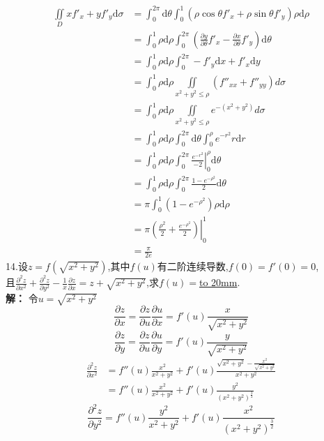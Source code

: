 \documentclass[a4paper]{article}
\begin{document}
\begin{align*}
    \iint\limits_{D} xf'_{x}+yf'_{y}\mathrm{d}\sigma &=\int_{0}^{2\pi} \mathrm{d}\theta \int_{0}^{1}(\rho\cos \theta f'_{x}+\rho\sin \theta f'_{y})\rho \mathrm{d}\rho\\
    &=\int_{0}^{1} \rho\mathrm{d}\rho \int_{0}^{2\pi} (\frac{\partial y}{\partial \theta}f'_{x}-\frac{\partial x}{\partial \theta}f'_{y})\mathrm{d}\theta\\
    &=\int_{0}^{1}\rho\mathrm{d}\rho\int_{0}^{2\pi}-f'_{y}\mathrm{d}x+f'_{x}\mathrm{d}y\\
    &=\int_{0}^{1}\rho\mathrm{d}\rho \iint\limits_{x^2+y^2\le \rho} (f''_{xx}+f''_{yy})d\sigma\\
    &=\int_{0}^{1}\rho\mathrm{d}\rho \iint\limits_{x^2+y^2\le \rho} e^{-(x^2+y^2)}d\sigma\\
    &=\int_{0}^{1}\rho \mathrm{d}\rho \int_{0}^{2\pi}\mathrm{d} \theta \int_{0}^{\rho} e^{-r^2} r\mathrm{d}r\\
    &=\int_{0}^{1}\rho \mathrm{d}\rho \int_{0}^{2\pi} \left. \frac{e^{-r^2}}{-2} \right|_{0}^{\rho} \mathrm{d} \theta\\
    &=\int_{0}^{1} \rho \mathrm{d}\rho \int_{0}^{2\pi}\frac{1-e^{-\rho^2}}{2}\mathrm{d}\theta \\
    &=\pi\int_{0}^{1} (1-e^{-\rho^2})\rho \mathrm{d}\rho\\
    &=\left.\pi(\frac{\rho^2}{2}+\frac{e^{-\rho^2}}{2})\right|_{0}^{1}\\
    &=\frac{\pi}{2e}
\end{align*}
14.设$z=f(\sqrt{x^2+y^2})$,其中$f(u)$有二阶连续导数,$f(0)=f'(0)=0$,\\
且$\frac{\partial^2 z}{\partial x^2}+\frac{\partial^2 z}{\partial y^2}-\frac{1}{x}\frac{\partial z}{\partial x}=z+\sqrt{x^2+y^2}$,求$f(u)=$\underline{\hbox to 20mm{}}.\\
\textbf{解：}
令$u=\sqrt{x^2+y^2}$
$$\frac{\partial z}{\partial x}=\frac{\partial z}{\partial u}\frac{\partial u}{\partial x} = f'(u)\frac{x}{\sqrt{x^2+y^2}}$$
$$\frac{\partial z}{\partial y}=\frac{\partial z}{\partial u}\frac{\partial u}{\partial y} = f'(u)\frac{y}{\sqrt{x^2+y^2}}$$
\begin{align*}
\frac{\partial^2 z}{\partial x^2}&=f''(u) \frac{x^2}{x^2+y^2}+f'(u)\frac{\sqrt{x^2+y^2} -\frac{x^2}{\sqrt{x^2+y^2}}}{x^2+y^2}\\
&=f''(u)\frac{x^2}{x^2+y^2}+f'(u)\frac{y^2}{(x^2+y^2)^{\frac{3}{2}}}
\end{align*}
$$\frac{\partial^2 z}{\partial y^2}=f''(u)\frac{y^2}{x^2+y^2}+f'(u)\frac{x^2}{(x^2+y^2)^{\frac{3}{2}}}$$
\end{document}
